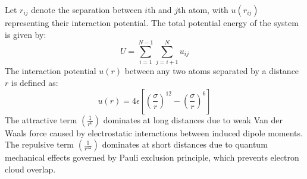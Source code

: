 \documentclass[12pt, a4paper, oneside]{article}
\begin{document}
        Let $r_{ij}$ denote the separation between $i$th and $j$th atom, with $u(r_{ij})$ representing their interaction potential. The total potential energy of the system is given by: $$U = \sum_{i=1}^{N-1} \sum_{j=i+1}^{N} u_{ij}$$
        The interaction potential $u(r)$ between any two atoms separated by a distance $r$ is defined as:
        \begin{equation}
            \label{eq1: Lennard-Jones Potential}
            u(r) = 4\epsilon \left[ \left(\frac{\sigma}{r}\right)^{12} - \left(\frac{\sigma}{r}\right)^{6} \right]
        \end{equation}
        The attractive term $\left(\frac{1}{r^6}\right)$ dominates at long distances due to weak Van der Waals force caused by electrostatic interactions between induced dipole moments. The repulsive term $\left(\frac{1}{r^12}\right)$ dominates at short distances due to quantum mechanical effects governed by Pauli exclusion principle, which prevents electron cloud overlap. 
\end{document}
